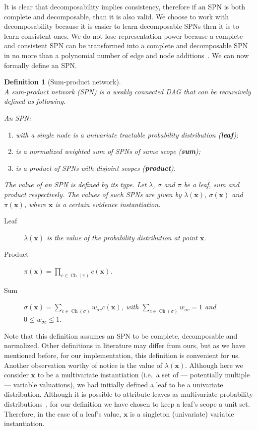 \documentclass{amsart}
\DeclareMathOperator*{\Ch}{\text{Ch}}
\theoremstyle{plain}
\newcounter{dummy-def}\numberwithin{dummy-def}{section}
\newtheorem{definition}[dummy-def]{Definition}
\newcounter{dummy-thm}\numberwithin{dummy-thm}{section}
\newcounter{dummy-prop}\numberwithin{dummy-prop}{section}
\newcounter{dummy-corollary}\numberwithin{dummy-corollary}{section}
\newcounter{dummy-lemma}\numberwithin{dummy-lemma}{section}
\newcounter{dummy-ex}\numberwithin{dummy-ex}{section}
\newcounter{dummy-eg}\numberwithin{dummy-eg}{section}
\numberwithin{equation}{section}
\begin{document}
It is clear that decomposability implies consistency, therefore if an SPN is both complete and
decomposable, than it is also valid. We choose to work with decomposability because it is easier to
learn decomposable SPNs then it is to learn consistent ones. We do not lose representation power
because a complete and consistent SPN can be transformed into a complete and decomposable SPN in no
more than a polynomial number of edge and node additions~\cite{theoretical-spn}. We can now
formally define an SPN\@.

\begin{definition}[Sum-product network]~\\
  A sum-product network (SPN) is a weakly connected DAG that can be recursively defined as
  following.

  An SPN\@:
  \begin{enumerate}
    \item with a single node is a univariate tractable probability distribution (\textbf{leaf});
    \item is a normalized weighted sum of SPNs of same scope (\textbf{sum});
    \item is a product of SPNs with disjoint scopes (\textbf{product}).
  \end{enumerate}
  The value of an SPN is defined by its type. Let $\lambda$, $\sigma$ and $\pi$ be a leaf, sum and
  product respectively. The values of such SPNs are given by $\lambda(\mathbf{x})$,
  $\sigma(\mathbf{x})$ and $\pi(\mathbf{x})$, where $\mathbf{x}$ is a certain evidence
  instantiation.
  \begin{description}
    \item[Leaf] $\lambda(\mathbf{x})$ is the value of the probability distribution at point
      $\mathbf{x}$.
    \item[Product] $\pi(\mathbf{x}) = \prod_{c \in \Ch(\pi)} c(\mathbf{x})$.
    \item[Sum] $\sigma(\mathbf{x}) = \sum_{c \in \Ch(\sigma)} w_{\sigma c} c(\mathbf{x})$, with
      $\sum_{c \in \Ch(\sigma)} w_{\sigma c} = 1$ and $0 \leq w_{\sigma c} \leq 1$.
  \end{description}
\end{definition}

Note that this definition assumes an SPN to be complete, decomposable and normalized. Other
definitions in literature may differ from ours, but as we have mentioned before, for our
implementation, this definition is convenient for us. Another observation worthy of notice is the
value of $\lambda(\mathbf{x})$. Although here we consider $\mathbf{x}$ to be a multivariate
instantiation (i.e.\ a set of --- potentially multiple --- variable valuations), we had initially
defined a leaf to be a univariate distribution. Although it is possible to attribute leaves as
multivariate probability distributions~\cite{id-spn}, for our definition we have chosen to keep a
leaf's scope a unit set. Therefore, in the case of a leaf's value, $\mathbf{x}$ is a singleton
(univariate) variable instantiation.
\end{document}
